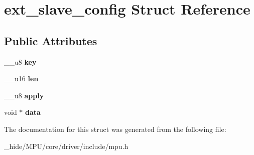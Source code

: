 \hypertarget{structext__slave__config}{}\section{ext\+\_\+slave\+\_\+config Struct Reference}
\label{structext__slave__config}
\subsection*{Public Attributes}
\begin{DoxyCompactItemize}
\item 
\hypertarget{structext__slave__config_a4d9bd4de01f18c45b1738992d482623b}{}\+\_\+\+\_\+u8 {\bfseries key}\label{structext__slave__config_a4d9bd4de01f18c45b1738992d482623b}

\item 
\hypertarget{structext__slave__config_a38d3e14095620e07f3ff9771f5bdd213}{}\+\_\+\+\_\+u16 {\bfseries len}\label{structext__slave__config_a38d3e14095620e07f3ff9771f5bdd213}

\item 
\hypertarget{structext__slave__config_a2e45c66835bb8e65858d0b396cd88843}{}\+\_\+\+\_\+u8 {\bfseries apply}\label{structext__slave__config_a2e45c66835bb8e65858d0b396cd88843}

\item 
\hypertarget{structext__slave__config_a2405326621a674b281e75bdb4f21cdfc}{}void $\ast$ {\bfseries data}\label{structext__slave__config_a2405326621a674b281e75bdb4f21cdfc}

\end{DoxyCompactItemize}


The documentation for this struct was generated from the following file\+:\begin{DoxyCompactItemize}
\item 
\+\_\+hide/\+M\+P\+U/core/driver/include/mpu.\+h\end{DoxyCompactItemize}
